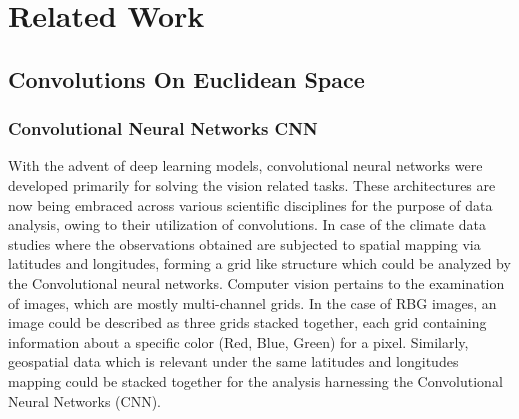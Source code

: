 
\clearpage
\cleardoublepage

\chapter{Related Work}
\label{chap:related_work}
\section{Convolutions On Euclidean Space}
\subsection{Convolutional Neural Networks CNN}
With the advent of deep learning models, convolutional neural networks were developed primarily for solving the vision related tasks. These architectures are now being embraced across various scientific disciplines for the purpose of data analysis, owing to their utilization of convolutions.
In case of the climate data studies where the observations obtained are subjected to spatial mapping via latitudes and longitudes, forming a grid like structure which could be analyzed by the Convolutional neural networks.
Computer vision pertains to the examination of images, which are mostly multi-channel grids. In the case of RBG images, an image could be described as three grids stacked together, each grid containing information about a specific color (Red, Blue, Green) for a pixel. Similarly, geospatial data which is relevant under the same latitudes and longitudes mapping could be stacked together for the analysis harnessing the Convolutional Neural Networks (CNN).

